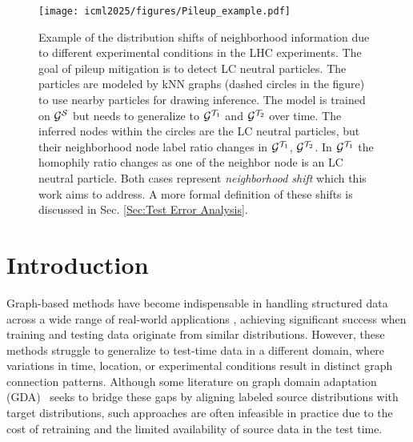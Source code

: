 






\begin{figure}[ht]  
    \centering  %
    \texttt{[image: icml2025/figures/Pileup\_example.pdf]} 
    \vspace{-2mm}
    \caption{Example of the distribution shifts of neighborhood information due to different experimental conditions in the LHC experiments.
    The goal of pileup mitigation is to detect LC neutral particles.
    The particles are modeled by kNN graphs (dashed circles in the figure) to use nearby particles for drawing inference.
    The model is trained on ${\mathcal{G}}^{\mathcal{S}}$ but needs to generalize to ${\mathcal{G}}^{{\mathcal{T}}_1}$ and ${\mathcal{G}}^{{\mathcal{T}}_2}$ over time. 
    The inferred nodes within the circles are the LC neutral particles, but their neighborhood node label ratio changes in ${\mathcal{G}}^{{\mathcal{T}}_1}$, ${\mathcal{G}}^{{\mathcal{T}}_2}$.
    In  ${\mathcal{G}}^{{\mathcal{T}}_1}$ the homophily ratio changes as one of the neighbor node is an LC neutral particle.
    Both cases represent \emph{neighborhood shift} which this work aims to address.
    A more formal definition of these shifts is discussed in Sec. \ref{Sec:Test Error Analysis}.}
    \label{fig:pileup_example}

    \vspace{-2mm}
\end{figure}





\section{Introduction}
\label{introduction}
Graph-based methods have become indispensable in handling structured data across a wide range of real-world applications \cite{duvenaud2015convolutional, bronstein2017geometric, zhang2019deep, stokes2020deep}, achieving significant success when training and testing data originate from similar distributions.
However, these methods struggle to generalize to test-time data in a different domain, where variations in time, location, or experimental conditions result in distinct graph connection patterns. 
Although some literature on graph domain adaptation (GDA)~\cite{wu2020unsupervised,you2023graph,zhu2021shift,liu2023structural} seeks to bridge these gaps by aligning labeled source distributions with target distributions, such approaches are often infeasible in practice due to the cost of retraining and the limited availability of source data in the test time.

